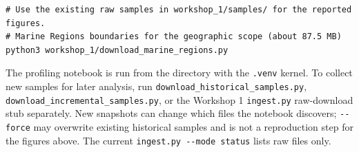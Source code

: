 \documentclass[a4paper,11pt,oneside]{book}
\begin{document}
\begin{appendices}
\begin{lstlisting}
# Use the existing raw samples in workshop_1/samples/ for the reported figures.
# Marine Regions boundaries for the geographic scope (about 87.5 MB)
python3 workshop_1/download_marine_regions.py

\end{lstlisting}
The profiling notebook  is run from the  directory with the \texttt{.venv} kernel.
To collect new samples for later analysis, run \texttt{download\_historical\_samples.py}, \texttt{download\_incremental\_samples.py}, or the Workshop 1 \texttt{ingest.py} raw-download stub separately. New snapshots can change which files the notebook discovers; \texttt{-{}-force} may overwrite existing historical samples and is not a reproduction step for the figures above. The current \texttt{ingest.py -{}-mode status} lists raw files only.
    \end{appendices}
\end{document}
